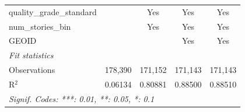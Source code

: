 \begin{tabular}{lcccc}
   quality\_grade\_standard                                        &                 & Yes             & Yes             & Yes\\  
   num\_stories\_bin                                               &                 & Yes             & Yes             & Yes\\  
   GEOID                                                           &                 &                 & Yes             & Yes\\  
   \midrule
   \emph{Fit statistics}\\
   Observations                                                    & 178,390         & 171,152         & 171,143         & 171,143\\  
   R$^2$                                                           & 0.06134         & 0.80881         & 0.88500         & 0.88510\\  
   \midrule \midrule
   \multicolumn{5}{l}{\emph{Signif. Codes: ***: 0.01, **: 0.05, *: 0.1}}\\
\end{tabular}
\par\endgroup

